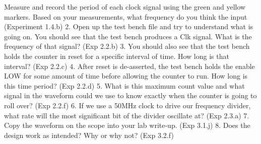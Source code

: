 \documentclass[a4paper,12pt]{article}
\begin{document}
Measure and record the period of each clock signal using the green and yellow markers. Based
on your measurements, what frequency do you think the input (Experiment 1.4.b)
2. Open up the test bench file and try to understand what is going on. You should see that the test
bench produces a Clk signal. What is the frequency of that signal? (Exp 2.2.b)
3. You should also see that the test bench holds the counter in reset for a specific interval of time.
How long is that interval? (Exp 2.2.c)
4. After reset is de-asserted, the test bench holds the enable LOW for some amount of time before
allowing the counter to run. How long is this time period? (Exp 2.2.d)
5. What is this maximum count value and what signal in the waveform could we use to know
exactly when the counter is going to roll over? (Exp 2.2.f)
6. If we use a 50MHz clock to drive our frequency divider, what rate will the most significant bit
of the divider oscillate at? (Exp 2.3.a)
7. Copy the waveform on the scope into your lab write-up. (Exp 3.1.j)
8. Does the design work as intended? Why or why not? (Exp 3.2.f)
\end{document}
